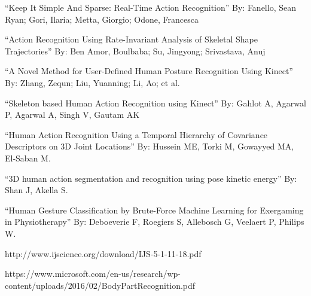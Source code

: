\documentclass{article}
\begin{document}
“Keep It Simple And Sparse: Real-Time Action Recognition”
By: Fanello, Sean Ryan; Gori, Ilaria; Metta, Giorgio; Odone, Francesca
 
“Action Recognition Using Rate-Invariant Analysis of Skeletal Shape Trajectories”
By: Ben Amor, Boulbaba; Su, Jingyong; Srivastava, Anuj
 
“A Novel Method for User-Defined Human Posture Recognition Using Kinect” 
By: Zhang, Zequn; Liu, Yuanning; Li, Ao; et al.
 
“Skeleton based Human Action Recognition using Kinect”
By: Gahlot A, Agarwal P, Agarwal A, Singh V, Gautam AK
 
“Human Action Recognition Using a Temporal Hierarchy of Covariance Descriptors on 3D Joint Locations”
By: Hussein ME, Torki M, Gowayyed MA, El-Saban M. 
 
“3D human action segmentation and recognition using pose kinetic energy” 
By: Shan J, Akella S.
 
“Human Gesture Classification by Brute-Force Machine Learning for Exergaming in Physiotherapy”
By: Deboeverie F, Roegiers S, Allebosch G, Veelaert P, Philips W.

http://www.ijscience.org/download/IJS-5-1-11-18.pdf

https://www.microsoft.com/en-us/research/wp-content/uploads/2016/02/BodyPartRecognition.pdf
\end{document}
